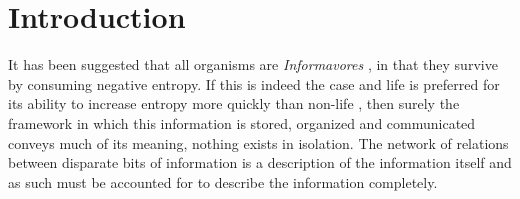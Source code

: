 

\graphicspath{{1_introduction/figures/}} %





\setcounter{page}{1}
\chapter{Introduction}
\label{sec:intro}
It has been suggested that all organisms are \emph{Informavores} \citep{MARGALEF1996141}, in that they survive by consuming negative entropy. If this is indeed the case and life is preferred for its ability to increase entropy more quickly than non-life \citep{england2013statistical}, then surely the framework in which this information is stored, organized and communicated conveys much of its meaning, \ie nothing exists in isolation. The network of relations between disparate bits of information is a description of the information itself and as such must be accounted for to describe the information completely. %

